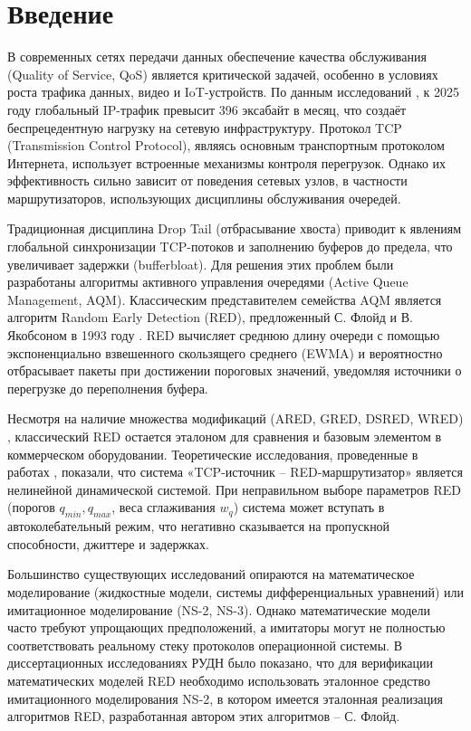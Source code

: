 \documentclass[10pt, conference, twocolumn, a4paper]{article}
\begin{document}
\section{Введение}
В современных сетях передачи данных обеспечение качества обслуживания (Quality of Service, QoS) является критической задачей, особенно в условиях роста трафика данных, видео и IoT-устройств. По данным исследований \cite{floyd1993random}, к 2025 году глобальный IP-трафик превысит 396 эксабайт в месяц, что создаёт беспрецедентную нагрузку на сетевую инфраструктуру. Протокол TCP (Transmission Control Protocol), являясь основным транспортным протоколом Интернета, использует встроенные механизмы контроля перегрузок. Однако их эффективность сильно зависит от поведения сетевых узлов, в частности маршрутизаторов, использующих дисциплины обслуживания очередей.

Традиционная дисциплина Drop Tail (отбрасывание хвоста) приводит к явлениям глобальной синхронизации TCP-потоков и заполнению буферов до предела, что увеличивает задержки (bufferbloat). Для решения этих проблем были разработаны алгоритмы активного управления очередями (Active Queue Management, AQM). Классическим представителем семейства AQM является алгоритм Random Early Detection (RED), предложенный С. Флойд и В. Якобсоном в 1993 году \cite{floyd1993random}. RED вычисляет среднюю длину очереди с помощью экспоненциально взвешенного скользящего среднего (EWMA) и вероятностно отбрасывает пакеты при достижении пороговых значений, уведомляя источники о перегрузке до переполнения буфера.

Несмотря на наличие множества модификаций (ARED, GRED, DSRED, WRED) \cite{korolkova2010phd}, классический RED остается эталоном для сравнения и базовым элементом в коммерческом оборудовании. Теоретические исследования, проведенные в работах \cite{korolkova2010phd, velieva2019phd}, показали, что система «TCP-источник -- RED-маршрутизатор» является нелинейной динамической системой. При неправильном выборе параметров RED (порогов $q_{min}, q_{max}$, веса сглаживания $w_q$) система может вступать в автоколебательный режим, что негативно сказывается на пропускной способности, джиттере и задержках.

Большинство существующих исследований опираются на математическое моделирование (жидкостные модели, системы дифференциальных уравнений) или имитационное моделирование (NS-2, NS-3). Однако математические модели часто требуют упрощающих предположений, а имитаторы могут не полностью соответствовать реальному стеку протоколов операционной системы. В диссертационных исследованиях РУДН \cite{korolkova2010phd, velieva2019phd} было показано, что для верификации математических моделей RED необходимо использовать эталонное средство имитационного моделирования NS-2, в котором имеется эталонная реализация алгоритмов RED, разработанная автором этих алгоритмов -- С. Флойд.
\end{document}
